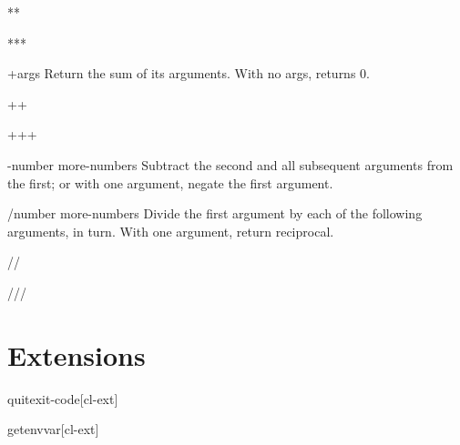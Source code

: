 \documentclass[10pt,english]{book}
\begin{document}
\begin{variable}{**}{}
  
\end{variable}

\begin{variable}{***}{}
  
\end{variable}

\begin{variable}{+}{\rest args}
  Return the sum of its arguments. With no args, returns 0.
\end{variable}

\begin{variable}{++}{}
  
\end{variable}

\begin{variable}{+++}{}
  
\end{variable}

\begin{variable}{-}{number \rest more-numbers}
  Subtract the second and all subsequent arguments from the first;
  or with one argument, negate the first argument.
\end{variable}

\begin{variable}{/}{number \rest more-numbers}
  Divide the first argument by each of the following arguments, in turn.
  With one argument, return reciprocal.
\end{variable}

\begin{variable}{//}{}
  
\end{variable}

\begin{variable}{///}{}
  
\end{variable}

\section{Extensions}
\label{sec:extensions}

\begin{function}{quit}{\op exit-code}[cl-ext]
  
\end{function}

\begin{function}{getenv}{var}[cl-ext]
  
\end{function}
\end{document}
